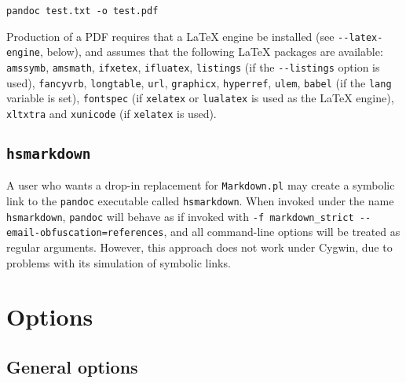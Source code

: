 \documentclass[]{article}
\begin{document}
\begin{verbatim}
pandoc test.txt -o test.pdf
\end{verbatim}

Production of a PDF requires that a LaTeX engine be installed (see
\texttt{-{}-latex-engine}, below), and assumes that the following LaTeX
packages are available: \texttt{amssymb}, \texttt{amsmath},
\texttt{ifxetex}, \texttt{ifluatex}, \texttt{listings} (if the
\texttt{-{}-listings} option is used), \texttt{fancyvrb},
\texttt{longtable}, \texttt{url}, \texttt{graphicx}, \texttt{hyperref},
\texttt{ulem}, \texttt{babel} (if the \texttt{lang} variable is set),
\texttt{fontspec} (if \texttt{xelatex} or \texttt{lualatex} is used as
the LaTeX engine), \texttt{xltxtra} and \texttt{xunicode} (if
\texttt{xelatex} is used).

\subsection{\texttt{hsmarkdown}}

A user who wants a drop-in replacement for \texttt{Markdown.pl} may
create a symbolic link to the \texttt{pandoc} executable called
\texttt{hsmarkdown}. When invoked under the name \texttt{hsmarkdown},
\texttt{pandoc} will behave as if invoked with
\texttt{-f markdown\_strict -{}-email-obfuscation=references}, and all
command-line options will be treated as regular arguments. However, this
approach does not work under Cygwin, due to problems with its simulation
of symbolic links.

\section{Options}

\subsection{General options}
\end{document}
